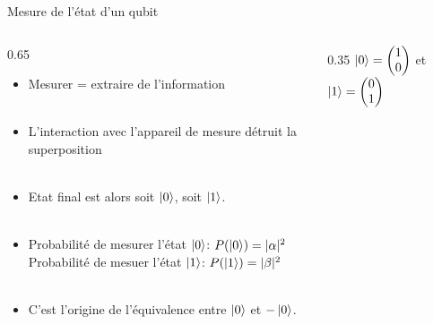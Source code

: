 \documentclass[aspectratio=169,12pt]{beamer}
\begin{document}
\begin{frame}{Mesure de l'état d'un qubit}
  \begin{columns}[T]
    \begin{column}{0.65\textwidth}
      \begin{itemize}[<+->]
      \item Mesurer = extraire de l'information\\~\\
      \item L'interaction avec l'appareil de mesure détruit la superposition\\~\\
      \item Etat final est alors soit $\ket 0$, soit $\ket 1$.\\~\\
      \item Probabilité de mesurer l'état $\ket 0$: $P(\ket 0)=|\alpha|^2$\\
      Probabilité de mesuer l'état $\ket 1$: $P(\ket 1)=|\beta|^2$\\~\\
      \item C'est l'origine de l'équivalence entre $\ket 0$ et $-\ket 0$.
\end{itemize}
    \end{column}
    \begin{column}{0.35\textwidth}
      \vspace{2em}
      \centering
      $\ket 0 = \begin{pmatrix}1 \\ 0\end{pmatrix}$ et $\ket 1 = \begin{pmatrix}0 \\ 1\end{pmatrix}$\\~\\~\\
    \end{column}
  \end{columns}
\end{frame}
\end{document}
